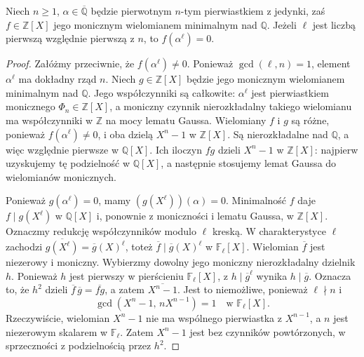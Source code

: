 \begin{lemat}
\label{aa:lem:cyclotomic-prime}
Niech $n\ge1$, $\alpha\in\overline{\mathbb Q}$ będzie
pierwotnym $n$-tym pierwiastkiem z jedynki, zaś
$f\in\mathbb Z[X]$ jego monicznym wielomianem minimalnym
nad $\mathbb Q$. Jeżeli $\ell$ jest liczbą pierwszą
względnie pierwszą z $n$, to $f(\alpha^\ell)=0$.
\end{lemat}
\begin{proof}
Załóżmy przeciwnie, że $f(\alpha^\ell)\ne0$.
Ponieważ $\gcd(\ell,n)=1$, element $\alpha^\ell$
ma dokładny rząd $n$. Niech $g\in\mathbb Z[X]$ będzie
jego monicznym wielomianem minimalnym nad $\mathbb Q$.
Jego współczynniki są całkowite: $\alpha^\ell$ jest
pierwiastkiem monicznego $\Phi_n\in\mathbb Z[X]$, a
moniczny czynnik nierozkładalny takiego wielomianu ma
współczynniki w $\mathbb Z$ na mocy lematu Gaussa.
Wielomiany $f$ i $g$ są różne, ponieważ
$f(\alpha^\ell)\ne0$, i oba dzielą $X^n-1$ w
$\mathbb Z[X]$. Są nierozkładalne nad $\mathbb Q$, a więc
względnie pierwsze w $\mathbb Q[X]$. Ich iloczyn
$fg$ dzieli $X^n-1$ w $\mathbb Z[X]$:
najpierw uzyskujemy tę podzielność w $\mathbb Q[X]$,
a następnie stosujemy lemat Gaussa do wielomianów monicznych.

Ponieważ $g(\alpha^\ell)=0$, mamy
$(g(X^\ell))(\alpha)=0$. Minimalność $f$ daje
$f\mid g(X^\ell)$ w $\mathbb Q[X]$ i, ponownie z
moniczności i lematu Gaussa, w $\mathbb Z[X]$.
Oznaczmy redukcję współczynników modulo $\ell$ kreską.
W charakterystyce $\ell$ zachodzi
$\overline{g(X^\ell)}=\overline g(X)^\ell$, toteż
\(\overline f\mid\overline g(X)^\ell\)
w $\mathbb F_\ell[X]$. Wielomian $\overline f$ jest
niezerowy i moniczny. Wybierzmy dowolny jego moniczny
nierozkładalny dzielnik $h$. Ponieważ $h$ jest
pierwszy w pierścieniu $\mathbb F_\ell[X]$, z
$h\mid\overline g^\ell$ wynika $h\mid\overline g$.
Oznacza to, że $h^2$ dzieli
$\overline f\,\overline g=\overline{fg}$, a zatem
$\overline{X^n-1}$. Jest to niemożliwe, ponieważ
$\ell\nmid n$ i
\[
\gcd(X^n-1,\,nX^{n-1})=1
\quad\text{w }\mathbb F_\ell[X].
\]
Rzeczywiście, wielomian $X^n-1$ nie ma wspólnego
pierwiastka z $X^{n-1}$, a $n$ jest niezerowym skalarem
w $\mathbb F_\ell$. Zatem $X^n-1$ jest bez czynników
powtórzonych, w sprzeczności z podzielnością przez $h^2$.
\end{proof}

